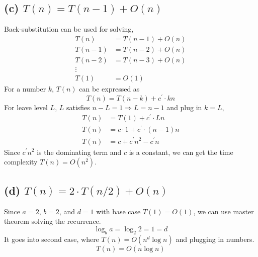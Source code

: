 \documentclass{article}
\begin{document}
\subsection*{(c) $T(n) = T(n-1) + O(n)$}
Back-substitution can be used for solving,
    \begin{align}
        T(n) & = T(n-1) + O(n) \nonumber \\
        T(n-1) & = T(n-2) + O(n) \nonumber \\
        T(n-2) & = T(n-3) + O(n) \nonumber \\
        \vdots \nonumber \\
        T(1) &= O(1) \nonumber
    \end{align}
For a number $k$, $T(n)$ can be expressed as 
$$T(n) = T(n-k) + c^\prime \cdot kn$$
For leave level $L$, $L$ satisfies $n-L = 1 \Rightarrow L = n-1$ and plug in $k = L$,
    \begin{align}
        T(n) &= T(1) + c^\prime  \cdot Ln \nonumber \\
        T(n) &= c \cdot 1 + c^\prime \cdot (n-1)n \nonumber \\
        T(n) &= c + c^\prime n^2 - c^\prime n \nonumber 
    \end{align}
Since $c^\prime n^2$ is the dominating term and $c$ is a constant, we can get the time complexity $T(n) = O(n^2)$.
\subsection*{(d) $T(n) = 2\cdot T(n/2) + O(n)$}
Since $a = 2$, $b = 2$, and $d = 1$ with base case $T(1) = O(1)$, we can use master theorem solving the recurrence.
$$\log_b a = \log_2 2 = 1 = d$$
It goes into second case, where $T(n) = O(n^d\log n)$ and plugging in numbers.
$$T(n) = O(n\log n)$$
\end{document}
